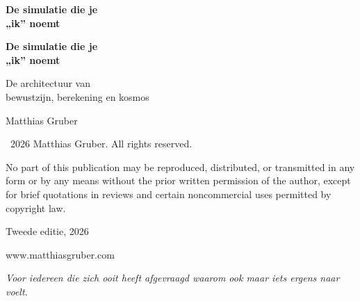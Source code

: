 \documentclass[11pt, twoside, openright]{book}
\makeatletter
\def\cleardoublepage{\clearpage\if@twoside \ifodd\c@page\else
  \thispagestyle{empty}\hbox{}\newpage
  \if@twocolumn\hbox{}\newpage\fi\fi\fi}
\makeatother
\begin{document}
\frontmatter
\pagestyle{empty}

\vspace*{3in}
\begin{center}
{\Huge\bfseries De simulatie die je\\[0.3cm] „ik” noemt\par}
\end{center}
\cleardoublepage

\vspace*{2in}
\begin{center}
{\Huge\bfseries De simulatie die je\\[0.3cm] „ik” noemt\par}
\vspace{0.8cm}
{\Large De architectuur van\\[0.2cm] bewustzijn, berekening en kosmos\par}
\vspace{2cm}
{\large Matthias Gruber\par}
\end{center}
\clearpage

\thispagestyle{empty}
\vspace*{\fill}
{\small
\noindent \textcopyright\ 2026 Matthias Gruber. All rights reserved.\par
\vspace{0.5cm}
\noindent No part of this publication may be reproduced, distributed, or transmitted
in any form or by any means without the prior written permission of the author,
except for brief quotations in reviews and certain noncommercial uses
permitted by copyright law.\par
\vspace{0.5cm}

\vspace{0.5cm}
\noindent Tweede editie, 2026\par
\vspace{0.5cm}
\noindent www.matthiasgruber.com\par
}
\cleardoublepage

\thispagestyle{empty}
\vspace*{3in}
\begin{center}
\textit{Voor iedereen die zich ooit heeft afgevraagd waarom ook maar iets ergens naar voelt.}
\end{center}
\cleardoublepage
\end{document}
